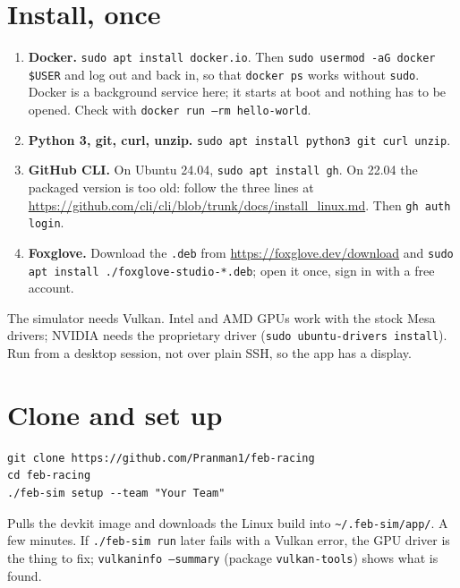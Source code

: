 
\section{Install, once}

\begin{enumerate}
  \item \textbf{Docker.} \texttt{sudo apt install docker.io}. Then
  \texttt{sudo usermod -aG docker \$USER} and log out and back in, so that \texttt{docker ps}
  works without \texttt{sudo}. Docker is a background service here; it starts at boot and nothing
  has to be opened. Check with \texttt{docker run --rm hello-world}.
  \item \textbf{Python 3, git, curl, unzip.} \texttt{sudo apt install python3 git curl unzip}.
  \item \textbf{GitHub CLI.} On Ubuntu 24.04, \texttt{sudo apt install gh}. On 22.04 the packaged
  version is too old: follow the three lines at
  \url{https://github.com/cli/cli/blob/trunk/docs/install_linux.md}. Then \texttt{gh auth login}.
  \item \textbf{Foxglove.} Download the \texttt{.deb} from \url{https://foxglove.dev/download} and
  \texttt{sudo apt install ./foxglove-studio-*.deb}; open it once, sign in with a free account.
\end{enumerate}

The simulator needs Vulkan. Intel and AMD GPUs work with the stock Mesa drivers; NVIDIA needs
the proprietary driver (\texttt{sudo ubuntu-drivers install}). Run from a desktop session, not
over plain SSH, so the app has a display.

\section{Clone and set up}

\begin{lstlisting}
git clone https://github.com/Pranman1/feb-racing
cd feb-racing
./feb-sim setup --team "Your Team"
\end{lstlisting}

Pulls the devkit image and downloads the Linux build into \texttt{\textasciitilde/.feb-sim/app/}.
A few minutes. If \texttt{./feb-sim run} later fails with a Vulkan error, the GPU driver is the
thing to fix; \texttt{vulkaninfo --summary} (package \texttt{vulkan-tools}) shows what is found.

